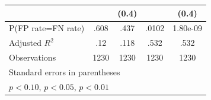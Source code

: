 \begin{table}[htbp]
\begin{tabular}{l*{4}{c}}
                &                  &    (0.4)         &                  &    (0.4)         \\
\hline
P(FP rate=FN rate)&     .608         &     .437         &    .0102         & 1.80e-09         \\
Adjusted \(R^{2}\)&      .12         &     .118         &     .532         &     .532         \\
Observations    &     1230         &     1230         &     1230         &     1230         \\
\hline\hline
\multicolumn{5}{l}{\footnotesize Standard errors in parentheses}\\
\multicolumn{5}{l}{\footnotesize \sym{*} \(p<0.10\), \sym{**} \(p<0.05\), \sym{***} \(p<0.01\)}\\
\end{tabular}
\end{table}
